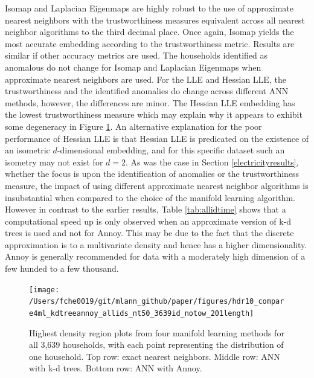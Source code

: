 \documentclass[12pt]{article}
\begin{document}
Isomap and Laplacian Eigenmaps are highly robust to the use of approximate nearest neighbors with the trustworthiness measures equivalent across all nearest neighbor algorithms to the third decimal place. Once again, Isomap yields the most accurate embedding according to the trustworthiness metric. Results are similar if other accuracy metrics are used. The households identified as anomalous do not change for Isomap and Laplacian Eigenmaps when approximate nearest neighbors are used. For the LLE and Hessian LLE, the trustworthiness and the identified anomalies do change across different ANN methods, however, the differences are minor. The Hessian LLE embedding has the lowest trustworthiness measure which may explain why it appears to exhibit some degeneracy in Figure \ref{fig:allidhdr}. An alternative explanation for the poor performance of Hessian LLE is that Hessian LLE is predicated on the existence of an isometric \(d\)-dimensional embedding, and for this specific dataset such an isometry may not exist for \(d=2\). As was the case in Section \ref{electricityresults}, whether the focus is upon the identification of anomalies or the trustworthiness measure, the impact of using different approximate nearest neighbor algorithms is insubstantial when compared to the choice of the manifold learning algorithm. However in contrast to the earlier results, Table \ref{tab:allidtime} shows that a computational speed up is only observed when an approximate version of k-d trees is used and not for Annoy. This may be due to the fact that the discrete approximation is to a multivariate density and hence has a higher dimensionality. Annoy is generally recommended for data with a moderately high dimension of a few hunded to a few thousand.

\begin{figure}

{\centering \texttt{[image: /Users/fche0019/git/mlann\_github/paper/figures/hdr10\_compare4ml\_kdtreeannoy\_allids\_nt50\_3639id\_notow\_201length]} 

}

\caption{Highest density region plots from four manifold learning methods for all 3,639 households, with each point representing the distribution of one household. Top row: exact nearest neighbors. Middle row: ANN with k-d trees. Bottom row: ANN with Annoy.}\label{fig:allidhdr}
\end{figure}
\end{document}
